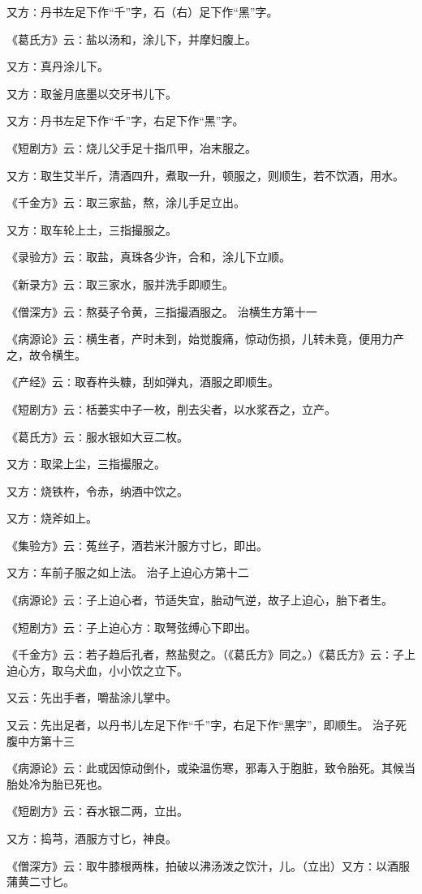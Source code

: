 \documentclass[a4paper,12pt,UTF8,twoside]{ctexbook}
\begin{document}
又方∶丹书左足下作“千”字，石（右）足下作“黑”字。

《葛氏方》云∶盐以汤和，涂儿下，并摩妇腹上。

又方∶真丹涂儿下。

又方∶取釜月底墨以交牙书儿下。

又方∶丹书左足下作“千”字，右足下作“黑”字。

《短剧方》云∶烧儿父手足十指爪甲，冶末服之。

又方∶取生艾半斤，清酒四升，煮取一升，顿服之，则顺生，若不饮酒，用水。

《千金方》云∶取三家盐，熬，涂儿手足立出。

又方∶取车轮上土，三指撮服之。

《录验方》云∶取盐，真珠各少许，合和，涂儿下立顺。

《新录方》云∶取三家水，服并洗手即顺生。

《僧深方》云∶熬葵子令黄，三指撮酒服之。
治横生方第十一

《病源论》云∶横生者，产时未到，始觉腹痛，惊动伤损，儿转未竟，便用力产之，故令横生。

《产经》云∶取舂杵头糠，刮如弹丸，酒服之即顺生。

《短剧方》云∶栝蒌实中子一枚，削去尖者，以水浆吞之，立产。

《葛氏方》云∶服水银如大豆二枚。

又方∶取梁上尘，三指撮服之。

又方∶烧铁杵，令赤，纳酒中饮之。

又方∶烧斧如上。

《集验方》云∶菟丝子，酒若米汁服方寸匕，即出。

又方∶车前子服之如上法。
治子上迫心方第十二

《病源论》云∶子上迫心者，节适失宜，胎动气逆，故子上迫心，胎下者生。

《短剧方》云∶子上迫心方∶取弩弦缚心下即出。

《千金方》云∶若子趋后孔者，熬盐熨之。（《葛氏方》同之。）《葛氏方》云∶子上迫心方，取乌犬血，小小饮之立下。

又云∶先出手者，嚼盐涂儿掌中。

又云∶先出足者，以丹书儿左足下作“千”字，右足下作“黑字”，即顺生。
治子死腹中方第十三

《病源论》云∶此或因惊动倒仆，或染温伤寒，邪毒入于胞脏，致令胎死。其候当胎处冷为胎已死也。

《短剧方》云∶吞水银二两，立出。

又方∶捣芎，酒服方寸匕，神良。

《僧深方》云∶取牛膝根两株，拍破以沸汤泼之饮汁，儿。（立出）又方∶以酒服蒲黄二寸匕。
\end{document}
